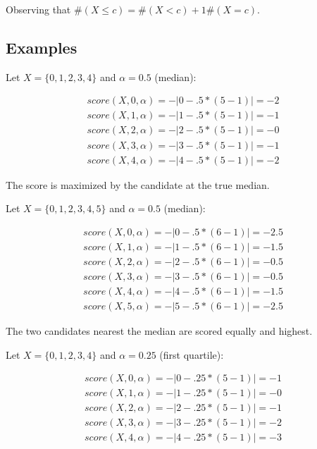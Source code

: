 Observing that $\#(X \leq c) = \#(X < c) + 1 \#(X = c)$.


\subsection{Examples}

Let $X = \{0,1,2,3,4\}$ and $\alpha = 0.5$ (median):

\begin{align*}
    score(X, 0, \alpha) = -|0 - .5 * (5 - 1)| = -2 \\
    score(X, 1, \alpha) = -|1 - .5 * (5 - 1)| = -1 \\
    score(X, 2, \alpha) = -|2 - .5 * (5 - 1)| = -0 \\
    score(X, 3, \alpha) = -|3 - .5 * (5 - 1)| = -1 \\
    score(X, 4, \alpha) = -|4 - .5 * (5 - 1)| = -2
\end{align*}

The score is maximized by the candidate at the true median.

Let $X = \{0,1,2,3,4,5\}$ and $\alpha = 0.5$ (median):

\begin{align*}
    score(X, 0, \alpha) = -|0 - .5 * (6 - 1)| = -2.5 \\
    score(X, 1, \alpha) = -|1 - .5 * (6 - 1)| = -1.5 \\
    score(X, 2, \alpha) = -|2 - .5 * (6 - 1)| = -0.5 \\
    score(X, 3, \alpha) = -|3 - .5 * (6 - 1)| = -0.5 \\
    score(X, 4, \alpha) = -|4 - .5 * (6 - 1)| = -1.5 \\
    score(X, 5, \alpha) = -|5 - .5 * (6 - 1)| = -2.5
\end{align*}

The two candidates nearest the median are scored equally and highest.

Let $X = \{0,1,2,3,4\}$ and $\alpha = 0.25$ (first quartile):

\begin{align*}
    score(X, 0, \alpha) = -|0 - .25 * (5 - 1)| = -1 \\
    score(X, 1, \alpha) = -|1 - .25 * (5 - 1)| = -0 \\
    score(X, 2, \alpha) = -|2 - .25 * (5 - 1)| = -1 \\
    score(X, 3, \alpha) = -|3 - .25 * (5 - 1)| = -2 \\
    score(X, 4, \alpha) = -|4 - .25 * (5 - 1)| = -3
\end{align*}

